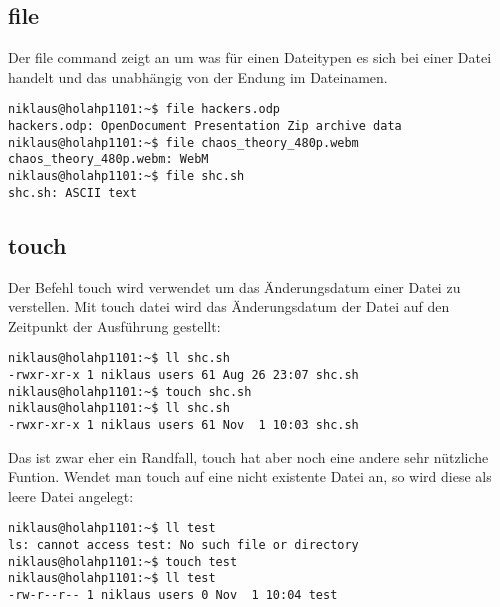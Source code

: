 \subsection{file}
Der file command zeigt an um was f\"ur einen Dateitypen es sich bei einer Datei handelt und das unabh\"angig von der Endung im Dateinamen.
\begin{lstlisting}
niklaus@holahp1101:~$ file hackers.odp 
hackers.odp: OpenDocument Presentation Zip archive data
niklaus@holahp1101:~$ file chaos_theory_480p.webm 
chaos_theory_480p.webm: WebM
niklaus@holahp1101:~$ file shc.sh 
shc.sh: ASCII text
\end{lstlisting}
\subsection{touch}
Der Befehl touch wird verwendet um das \"Anderungsdatum einer Datei zu verstellen. Mit touch datei wird das \"Anderungsdatum der Datei auf den Zeitpunkt der Ausf\"uhrung gestellt:
\begin{lstlisting}
niklaus@holahp1101:~$ ll shc.sh 
-rwxr-xr-x 1 niklaus users 61 Aug 26 23:07 shc.sh
niklaus@holahp1101:~$ touch shc.sh 
niklaus@holahp1101:~$ ll shc.sh 
-rwxr-xr-x 1 niklaus users 61 Nov  1 10:03 shc.sh
\end{lstlisting}
Das ist zwar eher ein Randfall, touch hat aber noch eine andere sehr n\"utzliche Funtion. Wendet man touch auf eine nicht existente Datei an, so wird diese als leere Datei angelegt:
\begin{lstlisting}
niklaus@holahp1101:~$ ll test
ls: cannot access test: No such file or directory
niklaus@holahp1101:~$ touch test
niklaus@holahp1101:~$ ll test
-rw-r--r-- 1 niklaus users 0 Nov  1 10:04 test
\end{lstlisting}
